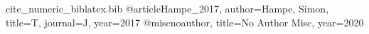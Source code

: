 \begin{filecontents*}{cite_numeric_biblatex.bib}
@article{Hampe_2017, author={Hampe, Simon}, title={T}, journal={J}, year={2017}}
@misc{noauthor, title={No Author Misc}, year={2020}}
\end{filecontents*}
\documentclass{article}
\usepackage[style=numeric]{biblatex}


A \cite{Hampe_2017}, B \parencite{Hampe_2017,noauthor}, C \textcite{Hampe_2017}, D \textcite{noauthor}.
\printbibliography

